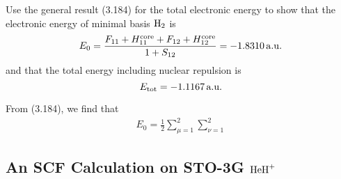 \documentclass[a4paper]{book}
\newcounter{exercise}[chapter]
\newcounter{solution}[chapter]
\newcommand{\core}{{\rm core}}
\newcommand{\au}{{\rm a.u.}}
\begin{document}
	\begin{exercise}
	Use the general result (3.184) for the total electronic energy to show that the electronic energy of minimal basis $\ce{H2}$ is
	\[
		E_0 = \frac{ F_{11} + H^\core_{11} + F_{12} + H^\core_{12} }{ 1 + S_{12} } = -1.8310 \, \au
	\]
	and that the total energy including nuclear repulsion is
	\[
		E_{\rm tot} = -1.1167 \, \text{a.u.}
	\]
	\end{exercise}
	
	\begin{solution}
	
	From (3.184), we find that
	\begin{align*}
		E_0 = \frac{1}{2} \sum_{ \mu=1 }^2 \sum_{ \nu=1 }^2 
	\end{align*}		
	
	\end{solution}
	
	\subsection{An SCF Calculation on STO-3G \texorpdfstring{$\ce{HeH+}$}-}
\end{document}
